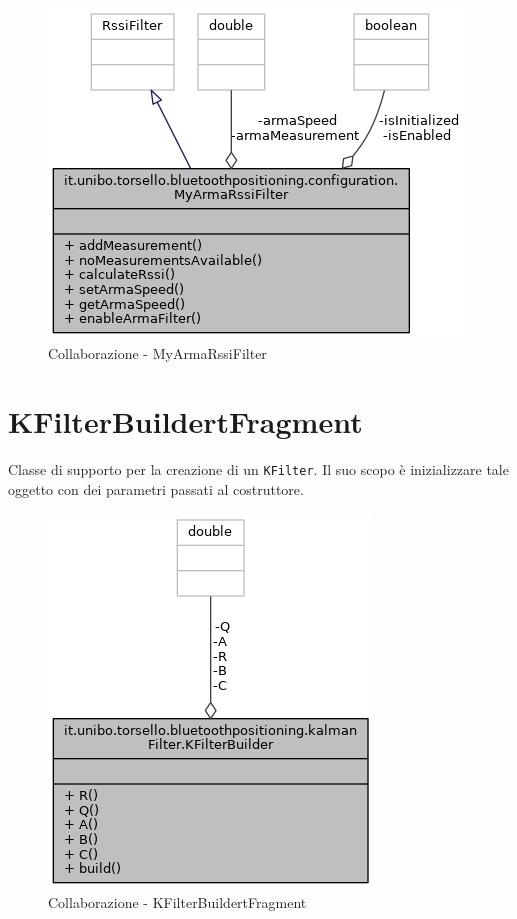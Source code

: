 \begin{figure}[ph]
	\centering
	\includegraphics[width=0.65\linewidth]{img/uml/class/classit_1_1unibo_1_1torsello_1_1bluetoothpositioning_1_1configuration_1_1MyArmaRssiFilter__coll__graph.png}
	\caption{Collaborazione - MyArmaRssiFilter}
\end{figure}

\newpage
\section{KFilterBuildertFragment}
Classe di supporto per la creazione di un \texttt{KFilter}. Il suo scopo è inizializzare tale oggetto con dei parametri passati al costruttore.
\begin{figure}[ph]
	\centering
	\includegraphics[width=0.6\linewidth]{img/uml/class/classit_1_1unibo_1_1torsello_1_1bluetoothpositioning_1_1kalmanFilter_1_1KFilterBuilder__coll__graph.png}
	\caption{Collaborazione - KFilterBuildertFragment}
\end{figure}

